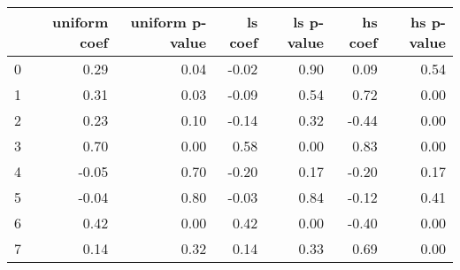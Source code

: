 \begin{tabular}{lrrrrrr}
\toprule
 & uniform coef & uniform p-value & ls coef & ls p-value & hs coef & hs p-value \\
\midrule
0 & 0.29 & 0.04 & -0.02 & 0.90 & 0.09 & 0.54 \\
1 & 0.31 & 0.03 & -0.09 & 0.54 & 0.72 & 0.00 \\
2 & 0.23 & 0.10 & -0.14 & 0.32 & -0.44 & 0.00 \\
3 & 0.70 & 0.00 & 0.58 & 0.00 & 0.83 & 0.00 \\
4 & -0.05 & 0.70 & -0.20 & 0.17 & -0.20 & 0.17 \\
5 & -0.04 & 0.80 & -0.03 & 0.84 & -0.12 & 0.41 \\
6 & 0.42 & 0.00 & 0.42 & 0.00 & -0.40 & 0.00 \\
7 & 0.14 & 0.32 & 0.14 & 0.33 & 0.69 & 0.00 \\
\bottomrule
\end{tabular}
